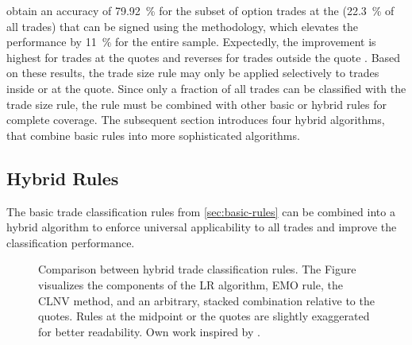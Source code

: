 \textcite[][13]{grauerOptionTradeClassification2022} obtain an accuracy of \SI{79.92}{\percent} for the subset of option trades at the  (\SI{22.3}{\percent} of all trades) that can be signed using the methodology, which elevates the performance by \SI{11}{\percent} for the entire sample. Expectedly, the improvement is highest for trades at the quotes and reverses for trades outside the quote \autocite[][15]{grauerOptionTradeClassification2022}. Based on these results, the trade size rule may only be applied selectively to trades inside or at the quote. Since only a fraction of all trades can be classified with the trade size rule, the rule must be combined with other basic or hybrid rules for complete coverage. The subsequent section introduces four hybrid algorithms, that combine basic rules into more sophisticated algorithms.

\subsection{Hybrid Rules}\label{sec:hybrid-rules}

The basic trade classification rules from \cref{sec:basic-rules} can be combined into a hybrid algorithm to enforce universal applicability to all trades and improve the classification performance.


\begin{figure}[ht!]
    \hfill
    \hfill\null
    \caption[Comparison Between Hybrid Trade Classification Rules]{Comparison between hybrid trade classification rules. The Figure visualizes the components of the \acrshort{LR} algorithm, \acrshort{EMO} rule, the \acrshort{CLNV} method, and an arbitrary, stacked combination relative to the quotes. Rules at the midpoint or the quotes are slightly exaggerated for better readability. Own work inspired by \textcite[][167]{poppeSensitivityVPINChoice2016}.}
    \label{fig:hybrid-algorithms}
\end{figure}

